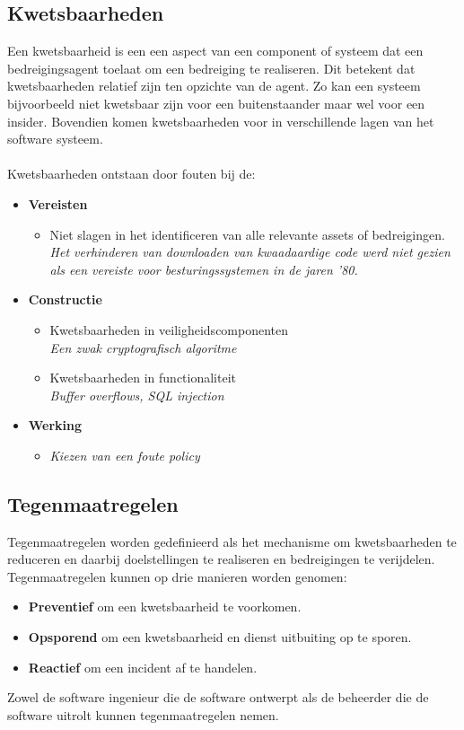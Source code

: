 \documentclass[../main.tex]{subfiles}
\begin{document}
\subsection{Kwetsbaarheden}
Een kwetsbaarheid is een een aspect van een component of systeem dat een bedreigingsagent toelaat om een bedreiging te realiseren. Dit betekent dat kwetsbaarheden relatief zijn ten opzichte van de agent. Zo kan een systeem bijvoorbeeld niet kwetsbaar zijn voor een buitenstaander maar wel voor een insider. Bovendien komen kwetsbaarheden voor in verschillende lagen van het software systeem.
\\\\
Kwetsbaarheden ontstaan door fouten bij de:
\begin{itemize}
	\item \textbf{Vereisten}
	\begin{itemize}
		\item Niet slagen in het identificeren van alle relevante assets of bedreigingen.
		\\ \textit{Het verhinderen van downloaden van kwaadaardige code werd niet gezien als een vereiste voor besturingssystemen in de jaren '80.}
	\end{itemize}
	\item \textbf{Constructie}
	\begin{itemize}
		\item Kwetsbaarheden in veiligheidscomponenten
		\\ \textit{Een zwak cryptografisch algoritme}
		\item Kwetsbaarheden in functionaliteit
		\\ \textit{Buffer overflows, SQL injection}
	\end{itemize}
	\item \textbf{Werking}
	\begin{itemize}
		\item \textit{Kiezen van een foute policy}
	\end{itemize}
\end{itemize}


\subsection{Tegenmaatregelen}
Tegenmaatregelen worden gedefinieerd als het mechanisme om kwetsbaarheden te reduceren en daarbij doelstellingen te realiseren en bedreigingen te verijdelen. Tegenmaatregelen kunnen op drie manieren worden genomen:
\begin{itemize}
	\item \textbf{Preventief} om een kwetsbaarheid te voorkomen.
	\item \textbf{Opsporend} om een kwetsbaarheid en dienst uitbuiting op te sporen.
	\item \textbf{Reactief} om een incident af te handelen.
\end{itemize}
\noindent
Zowel de software ingenieur die de software ontwerpt als de beheerder die de software uitrolt kunnen tegenmaatregelen nemen.
\end{document}
